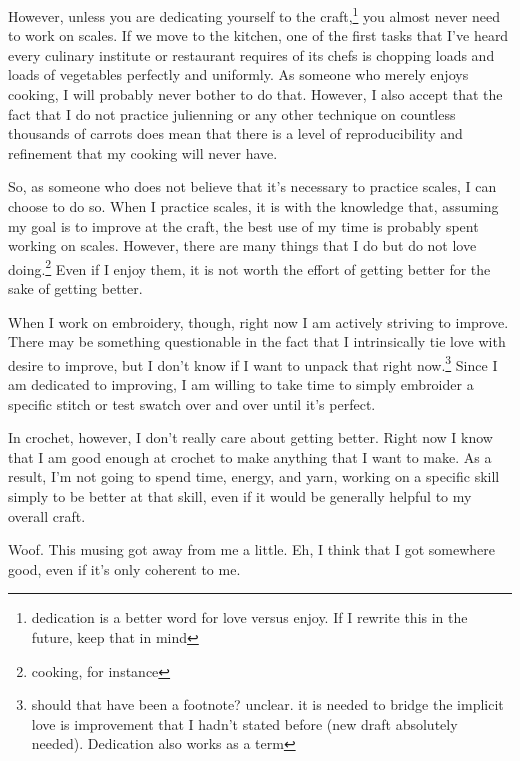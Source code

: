 \documentclass[12pt]{article}[titlepage]
\newcommand{\1}{\={a}}
\newcommand{\2}{\={e}}
\newcommand{\3}{\={\i}}
\newcommand{\4}{\=o}
\newcommand{\5}{\=u}
\newcommand{\6}{\={A}}
\renewcommand{\,}{\textsuperscript{,}}
\begin{document}
However, unless you are dedicating yourself to the craft,\footnote{dedication is a better word for love versus enjoy. If I rewrite this in the future, keep that in mind} you almost never need to work on scales.
If we move to the kitchen, one of the first tasks that I've heard every culinary institute or restaurant requires of its chefs is chopping loads and loads of vegetables perfectly and uniformly.
As someone who merely enjoys cooking, I will probably never bother to do that.
However, I also accept that the fact that I do not practice julienning or any other technique on countless thousands of carrots does mean that there is a level of reproducibility and refinement that my cooking will never have.

So, as someone who does not believe that it's necessary to practice scales, I can choose to do so.
When I practice scales, it is with the knowledge that, assuming my goal is to improve at the craft, the best use of my time is probably spent working on scales.
However, there are many things that I do but do not love doing.\footnote{cooking, for instance}
Even if I enjoy them, it is not worth the effort of getting better for the sake of getting better.

When I work on embroidery, though, right now I am actively striving to improve.
There may be something questionable in the fact that I intrinsically tie love with desire to improve, but I don't know if I want to unpack that right now.\footnote{should that have been a footnote? unclear. it is needed to bridge the implicit love is improvement that I hadn't stated before (new draft absolutely needed). Dedication also works as a term}
Since I am dedicated to improving, I am willing to take time to simply embroider a specific stitch or test swatch over and over until it's perfect.

In crochet, however, I don't really care about getting better.
Right now I know that I am good enough at crochet to make anything that I want to make.
As a result, I'm not going to spend time, energy, and yarn, working on a specific skill simply to be better at that skill, even if it would be generally helpful to my overall craft.

Woof. This musing got away from me a little. Eh, I think that I got somewhere good, even if it's only coherent to me.
\end{document}
